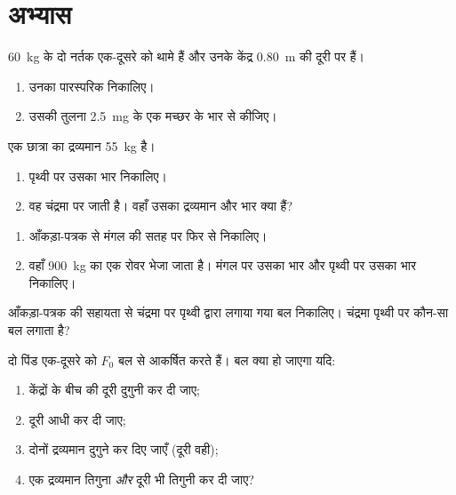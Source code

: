 \section{अभ्यास}

\begin{exercise}[$\star$]\label{exo:g10:universal-gravitation:1}
\qty{60}{kg} के दो नर्तक एक-दूसरे को थामे हैं और उनके केंद्र \qty{0.80}{m} की दूरी
पर हैं।
\begin{enumerate}
  \item उनका पारस्परिक  निकालिए।
  \item उसकी तुलना \qty{2.5}{mg} के एक मच्छर के भार से कीजिए।
\end{enumerate}
\end{exercise}

\begin{exercise}[$\star$]\label{exo:g10:universal-gravitation:2}
एक छात्रा का द्रव्यमान \qty{55}{kg} है।
\begin{enumerate}
  \item पृथ्वी पर उसका भार निकालिए।
  \item वह चंद्रमा पर जाती है। वहाँ उसका द्रव्यमान और भार क्या
        हैं?
\end{enumerate}
\end{exercise}

\begin{exercise}[$\star$]\label{exo:g10:universal-gravitation:3}
\begin{enumerate}
  \item आँकड़ा-पत्रक से मंगल की सतह पर  फिर से निकालिए।
  \item वहाँ \qty{900}{kg} का एक रोवर भेजा जाता है। मंगल पर उसका
        भार और पृथ्वी पर उसका भार निकालिए।
\end{enumerate}
\end{exercise}

\begin{exercise}[$\star$]\label{exo:g10:universal-gravitation:4}
आँकड़ा-पत्रक की सहायता से चंद्रमा पर पृथ्वी द्वारा लगाया गया बल
निकालिए। चंद्रमा पृथ्वी पर कौन-सा बल लगाता है?
\end{exercise}

\begin{exercise}[$\star$]\label{exo:g10:universal-gravitation:5}
दो पिंड एक-दूसरे को $F_0$ बल से आकर्षित करते हैं। बल क्या हो जाएगा
यदि:
\begin{enumerate}
  \item केंद्रों के बीच की दूरी दुगुनी कर दी जाए;
  \item दूरी आधी कर दी जाए;
  \item दोनों द्रव्यमान दुगुने कर दिए जाएँ (दूरी वही);
  \item एक द्रव्यमान तिगुना \emph{और} दूरी भी तिगुनी कर दी जाए?
\end{enumerate}
\end{exercise}

